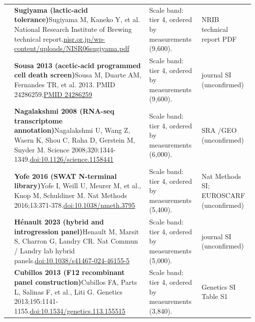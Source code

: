 \begin{landscape}
\begin{longtable}{@{}r@{\hspace{4pt}} L{86mm} L{92mm} L{62mm}@{}}
 & \textbf{Sugiyama (lactic-acid tolerance)}\newline Sugiyama M, Kaneko Y, et al. National Research Institute of Brewing technical report.\newline \href{https://www.nisr.or.jp/wp-content/uploads/NISR06sugiyama.pdf}{nisr.or.jp/\allowbreak wp-content/\allowbreak uploads/\allowbreak NISR06sugiyama.pdf} & Scale band: tier 4, ordered by measurements (9,600). & NRIB technical report PDF \\
 & \textbf{Sousa 2013 (acetic-acid programmed cell death screen)}\newline Sousa M, Duarte AM, Fernandes TR, et al. 2013. PMID 24286259.\newline \href{https://pubmed.ncbi.nlm.nih.gov/24286259/}{PMID 24286259} & Scale band: tier 4, ordered by measurements (9,600). & journal SI (unconfirmed) \\
 & \textbf{Nagalakshmi 2008 (RNA-seq transcriptome annotation)}\newline Nagalakshmi U, Wang Z, Waern K, Shou C, Raha D, Gerstein M, Snyder M. Science 2008;320:1344-1349.\newline \href{https://doi.org/10.1126/science.1158441}{doi:10.1126/\allowbreak science.1158441} & Scale band: tier 4, ordered by measurements (6,000). & SRA /\allowbreak  GEO (unconfirmed) \\
 & \textbf{Yofe 2016 (SWAT N-terminal library)}\newline Yofe I, Weill U, Meurer M, et al., Knop M, Schuldiner M. Nat Methods 2016;13:371-378.\newline \href{https://doi.org/10.1038/nmeth.3795}{doi:10.1038/\allowbreak nmeth.3795} & Scale band: tier 4, ordered by measurements (5,400). & Nat Methods SI; EUROSCARF (unconfirmed) \\
 & \textbf{Hénault 2023 (hybrid and introgression panel)}\newline Henault M, Marsit S, Charron G, Landry CR. Nat Commun / Landry lab hybrid panels.\newline \href{https://doi.org/10.1038/s41467-024-46155-5}{doi:10.1038/\allowbreak s41467-024-46155-5} & Scale band: tier 4, ordered by measurements (5,000). & journal SI (unconfirmed) \\
 & \textbf{Cubillos 2013 (F12 recombinant panel construction)}\newline Cubillos FA, Parts L, Salinas F, et al., Liti G. Genetics 2013;195:1141-1155.\newline \href{https://doi.org/10.1534/genetics.113.155515}{doi:10.1534/\allowbreak genetics.113.155515} & Scale band: tier 4, ordered by measurements (3,840). & Genetics SI Table S1 \\

\end{longtable}
\end{landscape}

